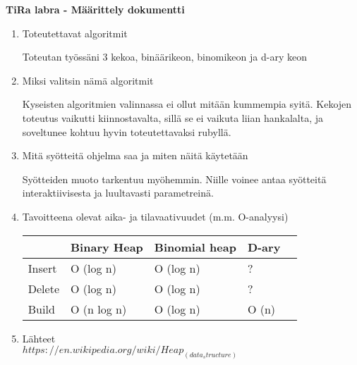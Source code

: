 \documentclass[a4paper,12pt]{article}
\begin{document}
\large {\bf TiRa labra - Määrittely dokumentti} 

\begin{enumerate}
\item Toteutettavat algoritmit

Toteutan työssäni 3 kekoa, binäärikeon, binomikeon ja d-ary keon

\item Miksi valitsin nämä algoritmit

Kyseisten algoritmien valinnassa ei ollut mitään kummempia syitä. Kekojen toteutus vaikutti
kiinnostavalta, sillä se ei vaikuta liian hankalalta, ja soveltunee kohtuu hyvin toteutettavaksi rubyllä.

\item Mitä syötteitä ohjelma saa ja miten näitä käytetään

Syötteiden muoto tarkentuu myöhemmin. 
Niille voinee antaa syötteitä interaktiivisesta ja luultavasti parametreinä.

\item Tavoitteena olevat aika- ja tilavaativuudet (m.m. O-analyysi)

\begin{tabular}{|l|l|l|l|l|}
\hline
&Binary Heap & Binomial heap & D-ary \\\hline
Insert & O (log n) & O (log n) & ?\\\hline
Delete  & O (log n) & O (log n) & ?\\\hline
Build & O (n log n) & O (log n) & O (n)\\\hline
\end{tabular}

\item Lähteet\\
$https://en.wikipedia.org/wiki/Heap_(data_structure)$

\end{enumerate}
\end{document}
